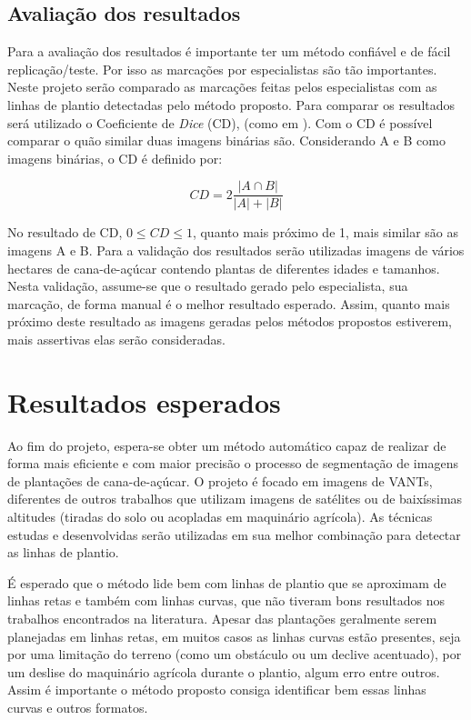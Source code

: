 \documentclass[12pt, a4paper, english, brazil]{article}
\begin{document}
\subsection{Avaliação dos resultados}

Para a avaliação dos resultados é importante ter um método confiável e de fácil replicação/teste. Por isso as marcações por especialistas são tão importantes. Neste projeto serão comparado as marcações feitas pelos especialistas com as linhas de plantio detectadas pelo método proposto. Para comparar os resultados será utilizado o Coeficiente de \textit{Dice} (CD), (como em ). Com o CD é possível comparar o quão similar duas imagens binárias são. Considerando A e B como imagens binárias, o CD é definido por:

\begin{equation}
    CD = 2 \frac{|A \cap B|}{|A| + |B|}
\end{equation}

No resultado de CD, $0 \le CD \le 1$, quanto mais próximo de 1, mais similar são as imagens A e B. Para a validação dos resultados serão utilizadas imagens de vários hectares de cana-de-açúcar contendo plantas de diferentes idades e tamanhos. Nesta validação, assume-se que o resultado gerado pelo especialista, sua marcação, de forma manual é o melhor resultado esperado. Assim, quanto mais próximo deste resultado as imagens geradas pelos métodos propostos estiverem, mais assertivas elas serão consideradas.

\section{Resultados esperados}

Ao fim do projeto, espera-se obter um método automático capaz de realizar de forma mais eficiente e com maior precisão o processo de segmentação de imagens de plantações de cana-de-açúcar. O projeto é focado em imagens de VANTs, diferentes de outros trabalhos que utilizam imagens de satélites ou de baixíssimas altitudes (tiradas do solo ou acopladas em maquinário agrícola). As técnicas estudas e desenvolvidas serão utilizadas em sua melhor combinação para detectar as linhas de plantio.

É esperado que o método lide bem com linhas de plantio que se aproximam de linhas retas e também com linhas curvas, que não tiveram bons resultados nos trabalhos encontrados na literatura. Apesar das plantações geralmente serem planejadas em linhas retas, em muitos casos as linhas curvas estão presentes, seja por uma limitação do terreno (como um obstáculo ou um declive acentuado), por um deslise do maquinário agrícola durante o plantio, algum erro entre outros. Assim é importante o método proposto consiga identificar bem essas linhas curvas e outros formatos.
\end{document}
